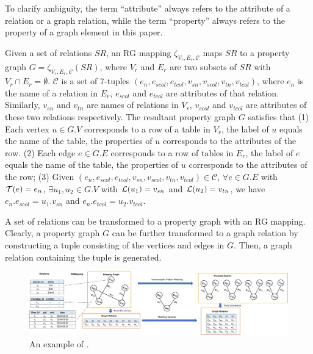 {%
To clarify ambiguity, the term ``attribute'' always refers to the attribute of a relation or a graph relation, while the term ``property'' always refers to the property of a graph element in this paper.

\begin{definition}
    Given a set of relations $SR$, an RG mapping $\zeta_{V_r, E_r, \mathcal{C}}$ maps $SR$ to a property graph $G = \zeta_{V_r, E_r, \mathcal{C}}(SR)$, where $V_r$ and $E_r$ are two subsets of $SR$ with $V_r \cap E_r = \emptyset$.
    $\mathcal{C}$ is a set of 7-tuples $(e_n, e_{scol}, e_{tcol}, v_{sn}, v_{scol}, v_{tn}, v_{tcol})$, where $e_n$ is the name of a relation in $E_r$, $e_{scol}$ and $e_{tcol}$ are attributes of that relation.
    Similarly, $v_{sn}$ and $v_{tn}$ are names of relations in $V_r$, $v_{scol}$ and $v_{tcol}$ are attributes of these two relations respectively.
    The resultant property graph $G$ satisfies that
    (1) Each vertex $u \in G.V$ corresponds to a row of a table in $V_r$, the label of $u$ equals the name of the table, the properties of $u$ corresponds to the attributes of the row.
    (2) Each edge $e \in G.E$ corresponds to a row of tables in $E_r$, the label of $e$ equals the name of the table, the properties of $u$ corresponds to the attributes of the row;
    (3) Given $(e_n, e_{scol}, e_{tcol}, v_{sn}, v_{scol}, v_{tn}, v_{tcol}) \in \mathcal{C}$, $\forall e \in G.E$ with $\mathcal{T}(e) = e_n$, $\exists u_1, u_2 \in G.V$ with $\mathcal{L}(u_1) = v_{sn}$ and $\mathcal{L}(u_2) = v_{tn}$, we have $e_n.e_{scol} = u_1.v_{sn}$ and $e_n.e_{tcol} = u_2.v_{tcol}$.
\end{definition}

A set of relations can be transformed to a property graph with an RG mapping.
Clearly, a property graph $G$ can be further transformed to a graph relation by constructing a tuple consisting of the vertices and edges in $G$.
Then, a graph relation containing the tuple is generated.
}

\begin{figure}
    \centering
    \includegraphics[width=\linewidth]{./figures/rgmapping.pdf}
    \caption{An example of \rgmapping.}
    \label{fig:intro-rgmapping-example}
\end{figure}

